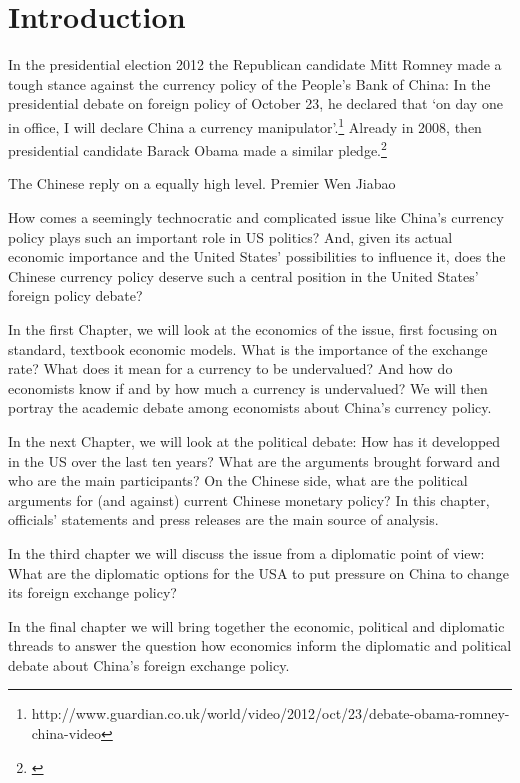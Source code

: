 \section{Introduction}

In the presidential election 2012 the Republican candidate Mitt Romney made a tough stance against the currency policy of the People's Bank of China: In the presidential debate on foreign policy of October 23, he declared that `on day one in office, I will declare China a currency manipulator'.\footnote{http://www.guardian.co.uk/world/video/2012/oct/23/debate-obama-romney-china-video}%
Already in 2008, then presidential candidate Barack Obama made a similar pledge.\footnote{\cite{Obama2008}}

The Chinese reply on a equally high level. Premier Wen Jiabao

How comes a seemingly technocratic and complicated issue like China's currency policy plays such an important role in US politics? And, given its actual economic importance and the United States' possibilities to influence it, does the Chinese currency policy deserve such a central position in the United States' foreign policy debate? %

In the first Chapter, we will look at the economics of the issue, first focusing on standard, textbook economic models. What is the importance of the exchange rate? What does it mean for a currency to be undervalued? And how do economists know if and by how much a currency is undervalued? We will then portray the academic debate among economists about China's currency policy. 

In the next Chapter, we will look at the political debate: How has it developped in the US over the last ten years? What are the arguments brought forward and who are the main participants? On the Chinese side, what are the political arguments for (and against) current Chinese monetary policy? In this chapter, officials' statements and press releases are the main source of analysis. %

In the third chapter we will discuss the issue from a diplomatic point of view: What are the diplomatic options for the USA to put pressure on China to change its foreign exchange policy? %

In the final chapter we will bring together the economic, political and diplomatic threads to answer the question how economics inform the diplomatic and political debate about China's foreign exchange policy.



